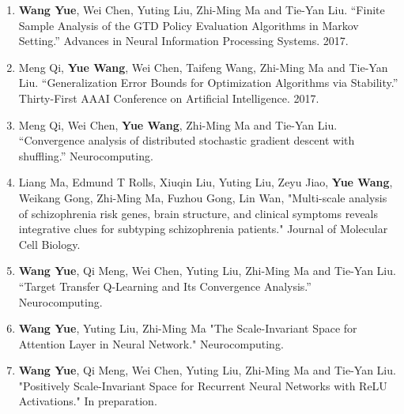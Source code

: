 \documentclass{resume}
\begin{document}
\begin{enumerate}
	\item \textbf{Wang Yue}, Wei Chen, Yuting Liu, Zhi-Ming Ma and Tie-Yan Liu. “Finite Sample Analysis of the GTD Policy Evaluation Algorithms in Markov Setting.” Advances in Neural Information Processing Systems. 2017. 
	
	\item Meng Qi, \textbf{Yue Wang}, Wei Chen, Taifeng Wang, Zhi-Ming Ma and Tie-Yan Liu. “Generalization Error Bounds for Optimization Algorithms via Stability.” Thirty-First AAAI Conference on Artificial Intelligence. 2017.
	
	\item Meng Qi, Wei Chen, \textbf{Yue Wang}, Zhi-Ming Ma and Tie-Yan Liu. “Convergence analysis of distributed stochastic gradient descent with shuffling.” Neurocomputing.
	
	\item Liang Ma, Edmund T Rolls, Xiuqin Liu, Yuting Liu, Zeyu Jiao, \textbf{Yue Wang}, Weikang Gong, Zhi-Ming Ma, Fuzhou Gong, Lin Wan, "Multi-scale analysis of schizophrenia risk genes, brain structure, and clinical symptoms reveals integrative clues for subtyping schizophrenia   patients." Journal of Molecular Cell Biology.
	
	
	\item \textbf{Wang Yue}, Qi Meng, Wei Chen, Yuting Liu, Zhi-Ming Ma and Tie-Yan Liu. “Target Transfer Q-Learning and Its Convergence Analysis.”   Neurocomputing.
		
	\item \textbf{Wang Yue}, Yuting Liu, Zhi-Ming Ma "The Scale-Invariant Space for Attention Layer in Neural  Network."   Neurocomputing.

	\item \textbf{Wang Yue}, Qi Meng, Wei Chen, Yuting Liu, Zhi-Ming Ma and Tie-Yan Liu.  "Positively Scale-Invariant Space for Recurrent Neural Networks with ReLU Activations." In preparation.

\end{enumerate}



\end{document}
